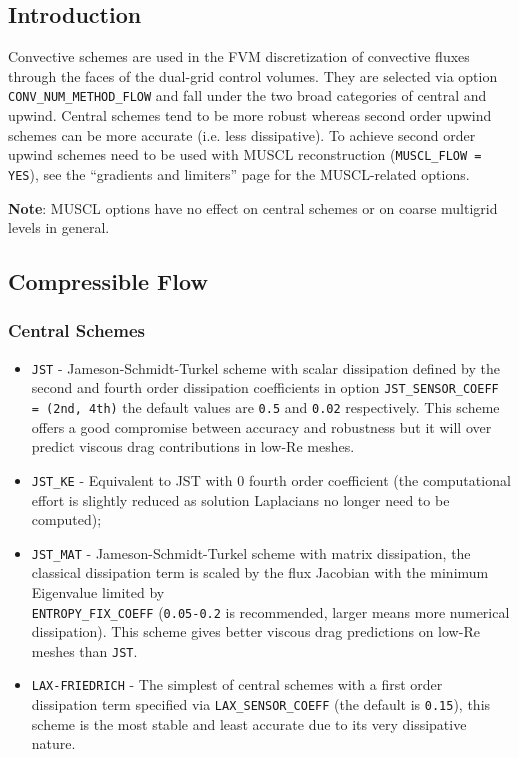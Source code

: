 \documentclass[12pt, a4paper, twoside]{article}
\begin{document}
\subsection{Introduction}
Convective schemes are used in the FVM discretization of convective fluxes through the faces of the dual-grid control volumes. They are selected via option \texttt{CONV\_NUM\_METHOD\_FLOW} and fall under the two broad categories of central and upwind. Central schemes tend to be more robust whereas second order upwind schemes can be more accurate (i.e. less dissipative). To achieve second order upwind schemes need to be used with MUSCL reconstruction (\verb|MUSCL_FLOW = YES|), see the “gradients and limiters” page for the MUSCL-related options.

\textbf{Note}: MUSCL options have no effect on central schemes or on coarse multigrid levels in general.


\subsection{Compressible Flow}

\subsubsection{Central Schemes}

\begin{itemize}
    \item \verb|JST| - Jameson-Schmidt-Turkel scheme with scalar dissipation defined by the second and fourth order dissipation coefficients in option \texttt{JST\_SENSOR\_COEFF = (2nd, 4th)} the default values are \verb|0.5| and \verb|0.02| respectively. This scheme offers a good compromise between accuracy and robustness but it will over predict viscous drag contributions in low-Re meshes.
    \item \verb|JST_KE| - Equivalent to JST with 0 fourth order coefficient (the computational effort is slightly reduced as solution Laplacians no longer need to be computed);
    \item  \verb|JST_MAT| - Jameson-Schmidt-Turkel scheme with matrix dissipation, the classical dissipation term is scaled by the flux Jacobian with the minimum Eigenvalue limited by \\ \verb|ENTROPY_FIX_COEFF| (\verb|0.05-0.2| is recommended, larger means more numerical dissipation). This scheme gives better viscous drag predictions on low-Re meshes than \verb|JST|.
    \item \verb|LAX-FRIEDRICH| - The simplest of central schemes with a first order dissipation term specified via \verb|LAX_SENSOR_COEFF| (the default is \verb|0.15|), this scheme is the most stable and least accurate due to its very dissipative nature.
\end{itemize}
\end{document}
